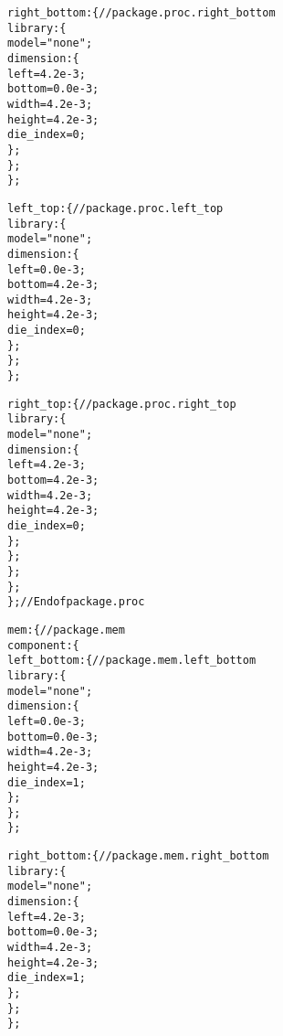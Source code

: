 {\begin{alltt}
                    right\_bottom: \{ // package.proc.right\_bottom
                        library: \{
                            model = "none";
                            dimension: \{
                                left = 4.2e-3;
                                bottom = 0.0e-3;
                                width = 4.2e-3;
                                height = 4.2e-3;
                                die_index = 0;
                            \};
                        \};
                    \};
                    
                    left\_top: \{ // package.proc.left\_top
                        library: \{
                            model = "none";
                            dimension: \{
                                left = 0.0e-3;
                                bottom = 4.2e-3;
                                width = 4.2e-3;
                                height = 4.2e-3;
                                die_index = 0;
                            \};
                        \};
                    \};
                                
                    right\_top: \{ // package.proc.right\_top
                        library: \{
                            model = "none";
                            dimension: \{
                                left = 4.2e-3;
                                bottom = 4.2e-3;
                                width = 4.2e-3;
                                height = 4.2e-3;
                                die_index = 0;
                            \};
                        \};
                    \};
                \};
            \}; // End of package.proc
            
            mem: \{ // package.mem
                component: \{
                    left\_bottom: \{ // package.mem.left\_bottom
                        library: \{
                            model = "none";
                            dimension: \{
                                left = 0.0e-3;
                                bottom = 0.0e-3;
                                width = 4.2e-3;
                                height = 4.2e-3;
                                die_index = 1;
                            \};
                        \};
                    \};

                    right\_bottom: \{ // package.mem.right\_bottom
                        library: \{
                            model = "none";
                            dimension: \{
                                left = 4.2e-3;
                                bottom = 0.0e-3;
                                width = 4.2e-3;
                                height = 4.2e-3;
                                die_index = 1;
                            \};
                        \};
                    \};


\end{alltt}}
